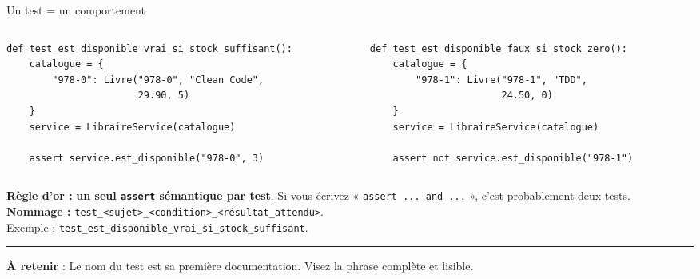 \documentclass[aspectratio=169,11pt]{beamer}
\newcommand{\takeaway}[1]{%
\vfill\begin{beamercolorbox}[wd=\linewidth,sep=0.4em]{}
\color{accent2}\rule[0.6ex]{1.2em}{1.2pt}\hspace{0.4em}%
\textbf{\color{accent2}\small À retenir} \textcolor{textsoft}{:} %
{\small\color{textmain}#1}
\end{beamercolorbox}}
\begin{document}
\begin{frame}[fragile,t,shrink=20]{Un test = un comportement}
\begin{columns}[T,onlytextwidth]
\begin{column}{0.49\textwidth}
\begin{lstlisting}[style=pythondark]
def test_est_disponible_vrai_si_stock_suffisant():
    catalogue = {
        "978-0": Livre("978-0", "Clean Code",
                       29.90, 5)
    }
    service = LibraireService(catalogue)

    assert service.est_disponible("978-0", 3)
\end{lstlisting}
\end{column}
\begin{column}{0.49\textwidth}
\begin{lstlisting}[style=pythondark]
def test_est_disponible_faux_si_stock_zero():
    catalogue = {
        "978-1": Livre("978-1", "TDD",
                       24.50, 0)
    }
    service = LibraireService(catalogue)

    assert not service.est_disponible("978-1")
\end{lstlisting}
\end{column}
\end{columns}
\vspace{0.4cm}
\footnotesize
\textbf{Règle d'or :} \textbf{un seul \texttt{assert} sémantique par test}. Si vous écrivez « \texttt{assert ... and ...} », c'est probablement deux tests.\\[0.3em]
\textbf{Nommage :} \texttt{test\_<sujet>\_<condition>\_<résultat\_attendu>}.\\
\textcolor{textsoft}{Exemple : \texttt{test\_est\_disponible\_vrai\_si\_stock\_suffisant}.}
\takeaway{Le nom du test est sa première documentation. Visez la phrase complète et lisible.}
\end{frame}
\end{document}
